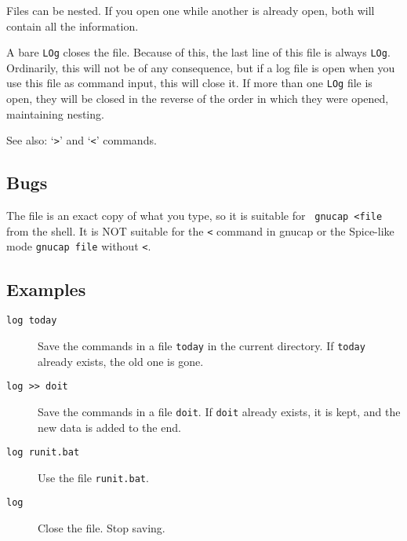 Files can be nested.  If you open one while another is already open, both
will contain all the information.

A bare {\tt LOg} closes the file.  Because of this, the last line of this
file is always {\tt LOg}.  Ordinarily, this will not be of any consequence,
but if a log file is open when you use this file as command input, this will
close it.  If more than one {\tt LOg} file is open, they will be closed in
the reverse of the order in which they were opened, maintaining nesting.

See also: `{\tt >}' and `{\tt <}' commands.
\subsection{Bugs}

The file is an exact copy of what you type, so it is suitable for {\tt
gnucap <file} from the shell.  It is NOT suitable for the {\tt <}
command in gnucap or the Spice-like mode {\tt gnucap file} without
{\tt <}.
\subsection{Examples}

\begin{description}

\item[{\tt log today}] Save the commands in a file {\tt today} in the
current directory.  If {\tt today} already exists, the old one is gone.

\item[{\tt log >> doit}] Save the commands in a file {\tt doit}.  If
{\tt doit} already exists, it is kept, and the new data is added to the
end.

\item[{\tt log runit.bat}] Use the file {\tt runit.bat}.

\item[{\tt log}] Close the file.  Stop saving.

\end{description}
